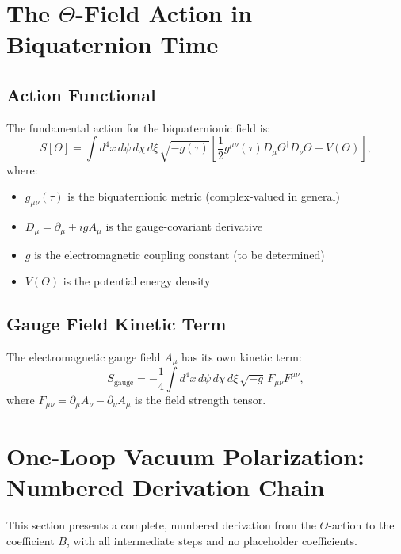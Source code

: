 \documentclass[11pt,a4paper]{article}
\theoremstyle{remark}
\begin{document}
\section{The $\Theta$-Field Action in Biquaternion Time}
\label{sec:theta-action}

\subsection{Action Functional}

The fundamental action for the biquaternionic field is:
\begin{equation}
S[\Theta] = \int d^4x \, d\psi \, d\chi \, d\xi \, \sqrt{-g(\tau)} \left[ \frac{1}{2} g^{\mu\nu}(\tau) D_\mu \Theta^\dagger D_\nu \Theta + V(\Theta) \right],
\label{eq:theta-action}
\end{equation}
where:
\begin{itemize}
\item $g_{\mu\nu}(\tau)$ is the biquaternionic metric (complex-valued in general)
\item $D_\mu = \partial_\mu + ig A_\mu$ is the gauge-covariant derivative
\item $g$ is the electromagnetic coupling constant (to be determined)
\item $V(\Theta)$ is the potential energy density
\end{itemize}

\subsection{Gauge Field Kinetic Term}

The electromagnetic gauge field $A_\mu$ has its own kinetic term:
\begin{equation}
S_{\text{gauge}} = -\frac{1}{4} \int d^4x \, d\psi \, d\chi \, d\xi \, \sqrt{-g} \, F_{\mu\nu} F^{\mu\nu},
\label{eq:gauge-kinetic}
\end{equation}
where $F_{\mu\nu} = \partial_\mu A_\nu - \partial_\nu A_\mu$ is the field strength tensor.

\section{One-Loop Vacuum Polarization: Numbered Derivation Chain}
\label{sec:one-loop}

This section presents a complete, numbered derivation from the $\Theta$-action to the coefficient $B$, with all intermediate steps and no placeholder coefficients.
\end{document}
